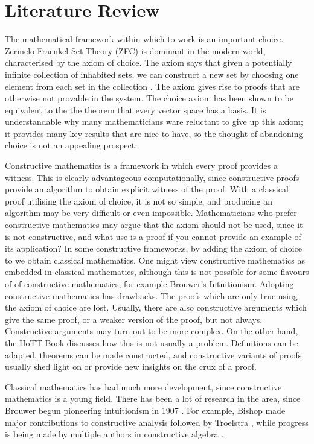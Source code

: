 \documentclass[ProjectReport]{subfiles}
\begin{document}
\section{Literature Review}
The mathematical framework within which to work is an important choice. Zermelo-Fraenkel Set Theory (ZFC) is dominant in the modern world, characterised by the axiom of choice. The axiom says that given a potentially infinite collection of inhabited sets, we can construct a new set by choosing one element from each set in the collection \cite{choiceaxiom}. The axiom gives rise to proofs that are otherwise not provable in the system. The choice axiom has been shown to be equivalent to the the theorem that every vector space has a basis. It is understandable why many mathematicians ware reluctant to give up this axiom; it provides many key results that are nice to have, so the thought of abandoning choice is not an appealing prospect. 

Constructive mathematics is a framework in which every proof provides a witness. This is clearly advantageous computationally, since constructive proofs provide an algorithm to obtain explicit witness of the proof. With a classical proof utilising the axiom of choice, it is not so simple, and producing an algorithm may be very difficult or even impossible. Mathematicians who prefer constructive mathematics may argue that the axiom should not be used, since it is not constructive, and what use is a proof if you cannot provide an example of its application? 
In some constructive frameworks, by adding the axiom of choice to we obtain classical mathematics. One might view constructive mathematics as embedded in classical mathematics, although this is not possible for some flavours of of constructive mathematics, for example Brouwer's Intuitionism. Adopting constructive mathematics has drawbacks. The proofs which are only true using the axiom of choice are lost. Usually, there are also constructive arguments which give the same proof, or a weaker version of the proof, but not always. Constructive arguments may turn out to be more complex. On the other hand, the HoTT Book \cite[Introduction - Constructivity]{hottbook} discusses how this is not usually a problem. Definitions can be adapted, theorems can be made constructed, and constructive variants of proofs usually shed light on or provide new insights on the crux of a proof.

Classical mathematics has had much more development, since constructive mathematics is a young field. There has been a lot of research in the area, since Brouwer begun pioneering intuitionism in 1907 \cite{Brouwer}. For example, Bishop made major contributions to constructive analysis \cite{Bishop1987-BISCA-2} followed by Troelstra \cite{Troelstra1973-TROMIO}, while progress is being made by multiple authors in constructive algebra \cite{2015}. 
\end{document}
